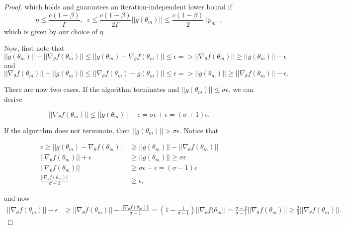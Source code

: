 \begin{proof}
which holds and guarantees an iteration-independent lower bound if 
\begin{equation}
    \eta \leq \frac{c(1-\beta)}{\Gamma}, \;\; \epsilon \leq \frac{c(1-\beta)}{2\Gamma}||g(\theta_m)|| \leq \frac{c(1-\beta)}{2}||p_m||,
\end{equation}
which is given by our choice of $\eta$.

Now, first note that
\begin{equation}
||g(\theta_m)|| - ||\nabla_\theta f(\theta_m)|| \leq ||g(\theta_m) - \nabla_\theta f(\theta_m)|| \leq \epsilon => ||\nabla_\theta f(\theta_m)|| \geq ||g(\theta_m)|| - \epsilon
\end{equation} and
\begin{equation}
||\nabla_\theta f(\theta_m)||-||g(\theta_m)|| \leq ||\nabla_\theta f(\theta_m)-g(\theta_m)|| \leq \epsilon => ||g(\theta_m)|| \geq ||\nabla_\theta f(\theta_m)|| - \epsilon.
\end{equation}

There are now two cases. If the algorithm terminates and $||g(\theta_m)|| \leq \sigma \epsilon$, we can derive 

\begin{equation}
    ||\nabla_\theta f(\theta_m)|| \leq ||g(\theta_m)|| + \epsilon = \sigma\epsilon+\epsilon = (\sigma+1)\epsilon.
\end{equation}


If the algorithm does not terminate, then $||g(\theta_m)|| > \sigma \epsilon$. Notice that 

\begin{align}
    \epsilon \geq ||g(\theta_m) - \nabla_\theta f(\theta_m)|| &\geq ||g(\theta_m)|| - ||\nabla_\theta f(\theta_m)|| \\
    ||\nabla_\theta f(\theta_m)|| + \epsilon &\geq ||g(\theta_m)|| \geq \sigma \epsilon \\
    ||\nabla_\theta f(\theta_m)|| &\geq \sigma \epsilon - \epsilon = (\sigma - 1)\epsilon \\
    \frac{||\nabla_\theta f(\theta_m)||}{\sigma-1} &\geq \epsilon,
\end{align}

and now 
\begin{align}
    ||\nabla_\theta f(\theta_m)|| - \epsilon
    &\geq  ||\nabla_\theta f(\theta_m)|| - \frac{||\nabla_\theta f(\theta_m)||}{\sigma-1} = \left(1-\frac{1}{\sigma-1}\right)||\nabla_\theta f(\theta_m|| = \frac{\sigma-2}{\sigma-1}||\nabla_\theta f(\theta_m)|| \geq \frac{2}{3}||\nabla_\theta f(\theta_m)||.
\end{align}


\end{proof}
